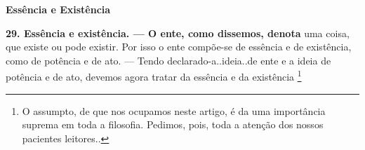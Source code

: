 \documentclass[12pt,a4paper]{article}
\newcommand{\pagmark}[1]{\quad[\textit{p.\,#1}]\quad}
\begin{document}
\begin{center}
  {\large \textbf{Essência e Existência}}
\end{center}

\vspace{1.5em}

\pagmark{302}

\medskip\noindent\textbf{29. Essência e existência. — O ente, como dissemos, denota}
uma coisa, que existe ou pode existir. Por isso o ente compõe-se
de essência e de existência, como de potência e de ato. — Tendo
declarado-a..ideia..de ente e a ideia de potência e de ato, devemos
agora tratar da essência e da existência \footnote{O assumpto, de que nos ocupamos neste artigo, é da uma importância suprema em toda a filosofia. Pedimos, pois, toda a atenção dos
 nossos pacientes leitores.. 
\pagmark{302}

}
\end{document}
